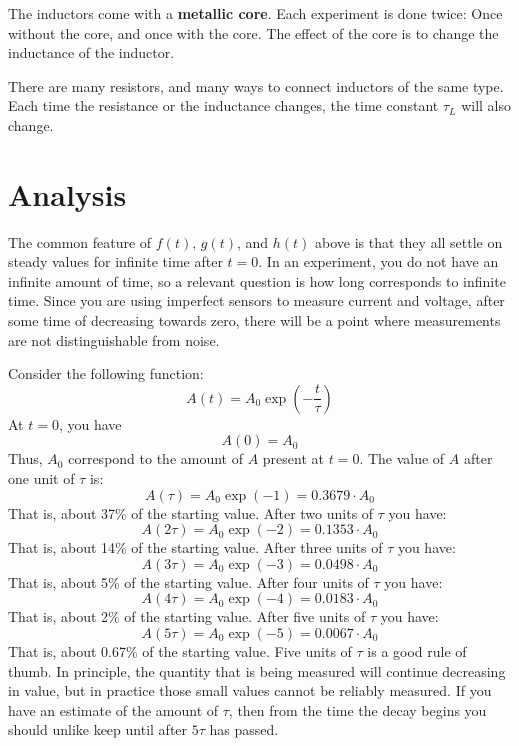 The inductors come with a \textbf{metallic core}. Each experiment is done twice: Once without the core, and once with the core. The effect of the core is to change the inductance of the inductor.

There are many resistors, and many ways to connect inductors of the same type. Each time the resistance or the inductance changes, the time constant $\tau_{L}$ will also change.
\section{Analysis}
The common feature of $f(t)$, $g(t)$, and $h(t)$ above is that they all settle on steady values for infinite time after $t = 0$. In an experiment, you do not have an infinite amount of time, so a relevant question is how long corresponds to infinite time. Since you are using imperfect sensors to measure current and voltage, after some time of decreasing towards zero, there will be a point where measurements are not distinguishable from noise.

Consider the following function:
\begin{equation}
    A(t) = A_{0} \exp\left(- \frac{t}{\tau}\right)
\end{equation}
At $t = 0$, you have
\begin{equation}
    A(0) = A_{0}
\end{equation}
Thus, $A_{0}$ correspond to the amount of $A$ present at $t = 0$. The value of $A$ after one unit of $\tau$ is:
\begin{equation}
    A(\tau) = A_{0} \exp\left(-1\right) = 0.3679 \cdot A_{0}
\end{equation}
That is, about 37\% of the starting value. After two units of $\tau$ you have:
\begin{equation}
    A(2\tau) = A_{0} \exp\left(-2\right) = 0.1353 \cdot A_{0}
\end{equation}
That is, about 14\% of the starting value. After three units of $\tau$ you have:
\begin{equation}
    A(3\tau) = A_{0} \exp\left(-3\right) = 0.0498 \cdot A_{0}
\end{equation}
That is, about 5\% of the starting value. After four units of $\tau$ you have:
\begin{equation}
    A(4\tau) = A_{0} \exp\left(-4\right) = 0.0183 \cdot A_{0}
\end{equation}
That is, about 2\% of the starting value. After five units of $\tau$ you have:
\begin{equation}
    A(5\tau) = A_{0} \exp\left(-5\right) = 0.0067 \cdot A_{0}
\end{equation}
That is, about 0.67\% of the starting value. Five units of $\tau$ is a good rule of thumb. In principle, the quantity that is being measured will continue decreasing in value, but in practice those small values cannot be reliably measured. If you have an estimate of the amount of $\tau$, then from the time the decay begins you should unlike keep until after $5 \tau$ has passed.
